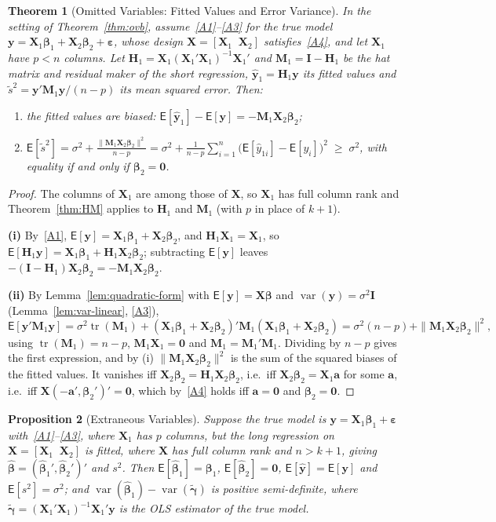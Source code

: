 \documentclass[14pt]{extarticle}
\theoremstyle{plain}
\newtheorem{theorem}{Theorem}[section]
\newtheorem{proposition}[theorem]{Proposition}
\theoremstyle{definition}
\theoremstyle{remark}
\newcommand\expc{\mathsf{E}}
\DeclareMathOperator\var{var}
\DeclareMathOperator\tr{tr}
\newcommand{\ds}{\displaystyle}
\newcommand{\bX}{\mathbf{X}}
\newcommand{\by}{\mathbf{y}}
\def\bb{\boldsymbol{\beta}}
\newcommand{\be}{\boldsymbol{\varepsilon}}
\newcommand{\bI}{\mathbf{I}}
\newcommand{\bH}{\mathbf{H}}
\newcommand{\bM}{\mathbf{M}}
\newcommand{\bzero}{\mathbf{0}}
\newcommand{\ba}{\mathbf{a}}
\begin{document}
\begin{theorem}[Omitted Variables: Fitted Values and Error Variance]\label{thm:ovb-fit}
In the setting of Theorem~\ref{thm:ovb}, assume~\ref{A1}--\ref{A3} for the true model $\by = \bX_1\bb_1 + \bX_2\bb_2 + \be$, whose design $\bX = [\bX_1 \;\; \bX_2]$ satisfies~\ref{A4}, and let $\bX_1$ have $p < n$ columns. Let $\bH_1 = \bX_1(\bX_1'\bX_1)^{-1}\bX_1'$ and $\bM_1 = \bI - \bH_1$ be the hat matrix and residual maker of the short regression, $\hat{\by}_1 = \bH_1\by$ its fitted values and $\tilde s^2 = \by'\bM_1\by/(n-p)$ its mean squared error. Then:
\begin{enumerate}[label=\textup{(\roman*)}]
\item the fitted values are biased: $\expc[\hat{\by}_1] - \expc[\by] = -\bM_1\bX_2\bb_2$;
\item\label{ovbfit:ii} $\ds\expc[\tilde s^2] = \sigma^2 + \frac{\|\bM_1\bX_2\bb_2\|^2}{n-p} = \sigma^2 + \frac{1}{n-p}\sum_{i=1}^n\bigl(\expc[\hat y_{1i}] - \expc[y_i]\bigr)^2 \;\geqslant\; \sigma^2$, with equality if and only if $\bb_2 = \bzero$.
\end{enumerate}
\end{theorem}

\begin{proof}
The columns of $\bX_1$ are among those of $\bX$, so $\bX_1$ has full column rank and Theorem~\ref{thm:HM} applies to $\bH_1$ and $\bM_1$ (with $p$ in place of $k + 1$).

\textbf{(i)} By~\ref{A1}, $\expc[\by] = \bX_1\bb_1 + \bX_2\bb_2$, and $\bH_1\bX_1 = \bX_1$, so $\expc[\bH_1\by] = \bX_1\bb_1 + \bH_1\bX_2\bb_2$; subtracting $\expc[\by]$ leaves $-(\bI - \bH_1)\bX_2\bb_2 = -\bM_1\bX_2\bb_2$.

\textbf{(ii)} By Lemma~\ref{lem:quadratic-form} with $\expc[\by] = \bX\bb$ and $\var(\by) = \sigma^2\bI$ (Lemma~\ref{lem:var-linear}, \ref{A3}),
\[
\expc[\by'\bM_1\by] = \sigma^2\tr(\bM_1) + (\bX_1\bb_1 + \bX_2\bb_2)'\bM_1(\bX_1\bb_1 + \bX_2\bb_2) = \sigma^2(n - p) + \|\bM_1\bX_2\bb_2\|^2,
\]
using $\tr(\bM_1) = n - p$, $\bM_1\bX_1 = \bzero$ and $\bM_1 = \bM_1'\bM_1$. Dividing by $n - p$ gives the first expression, and by (i) $\|\bM_1\bX_2\bb_2\|^2$ is the sum of the squared biases of the fitted values. It vanishes iff $\bX_2\bb_2 = \bH_1\bX_2\bb_2$, i.e.\ iff $\bX_2\bb_2 = \bX_1\ba$ for some $\ba$, i.e.\ iff $\bX(-\ba', \bb_2')' = \bzero$, which by~\ref{A4} holds iff $\ba = \bzero$ and $\bb_2 = \bzero$.
\end{proof}

\begin{proposition}[Extraneous Variables]\label{prop:extraneous}
Suppose the true model is $\by = \bX_1\bb_1 + \be$ with~\ref{A1}--\ref{A3}, where $\bX_1$ has $p$ columns, but the long regression on $\bX = [\bX_1 \;\; \bX_2]$ is fitted, where $\bX$ has full column rank and $n > k + 1$, giving $\hat{\bb} = (\hat{\bb}_1', \hat{\bb}_2')'$ and $s^2$. Then $\expc[\hat{\bb}_1] = \bb_1$, $\expc[\hat{\bb}_2] = \bzero$, $\expc[\hat{\by}] = \expc[\by]$ and $\expc[s^2] = \sigma^2$; and $\var(\hat{\bb}_1) - \var(\tilde{\boldsymbol\gamma})$ is positive semi-definite, where $\tilde{\boldsymbol\gamma} = (\bX_1'\bX_1)^{-1}\bX_1'\by$ is the OLS estimator of the true model.
\end{proposition}
\end{document}
